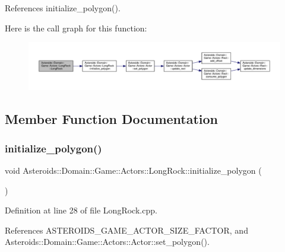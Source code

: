 References initialize\+\_\+polygon().

Here is the call graph for this function\+:\nopagebreak
\begin{figure}[H]
\begin{center}
\leavevmode
\includegraphics[width=350pt]{classAsteroids_1_1Domain_1_1Game_1_1Actors_1_1LongRock_a076888291134eee7db8c6a94ebc0ad8d_cgraph}
\end{center}
\end{figure}


\subsection{Member Function Documentation}
\mbox{\label{classAsteroids_1_1Domain_1_1Game_1_1Actors_1_1LongRock_ac2469234e9ea81472af9e7297ff8a75a}} 
\subsubsection{\texorpdfstring{initialize\+\_\+polygon()}{initialize\_polygon()}}
{\footnotesize\ttfamily void Asteroids\+::\+Domain\+::\+Game\+::\+Actors\+::\+Long\+Rock\+::initialize\+\_\+polygon (\begin{DoxyParamCaption}{ }\end{DoxyParamCaption})\hspace{0.3cm}{\ttfamily [private]}}



Definition at line 28 of file Long\+Rock.\+cpp.



References A\+S\+T\+E\+R\+O\+I\+D\+S\+\_\+\+G\+A\+M\+E\+\_\+\+A\+C\+T\+O\+R\+\_\+\+S\+I\+Z\+E\+\_\+\+F\+A\+C\+T\+OR, and Asteroids\+::\+Domain\+::\+Game\+::\+Actors\+::\+Actor\+::set\+\_\+polygon().




